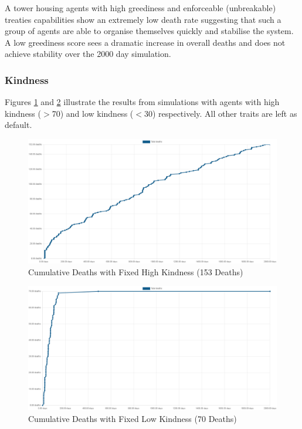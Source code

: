 A tower housing agents with high greediness and enforceable (unbreakable) treaties capabilities show an extremely low death rate suggesting that such a group of agents are able to organise themselves quickly and stabilise the system. A low greediness score sees a dramatic increase in overall deaths and does not achieve stability over the 2000 day simulation.

\subsubsection{Kindness}
\label{subsubsec: Kindness}

Figures \ref{fig: Fixed High Kindness} and \ref{fig: Fixed Low Kindness} illustrate the results from simulations with agents with high kindness ($>$70) and low kindness ($<$30) respectively. All other traits are left as default.

\begin{figure}[H]
    \begin{center}
        \includegraphics[scale=0.25]{Images/Cumulative Deaths, fixed high kindness, T7Only, 2000days, 20food, 153deaths.png}
    \end{center}
    \caption{Cumulative Deaths with Fixed High Kindness (153 Deaths)}
    \label{fig: Fixed High Kindness}
\end{figure}

\begin{figure}[H]
    \begin{center}
        \includegraphics[scale=0.25]{Images/Cumulative Deaths, fixed low kindness, T7Only, 2000days, 20food, 70deaths.png}
    \end{center}
    \caption{Cumulative Deaths with Fixed Low Kindness (70 Deaths)}
    \label{fig: Fixed Low Kindness}
\end{figure}

